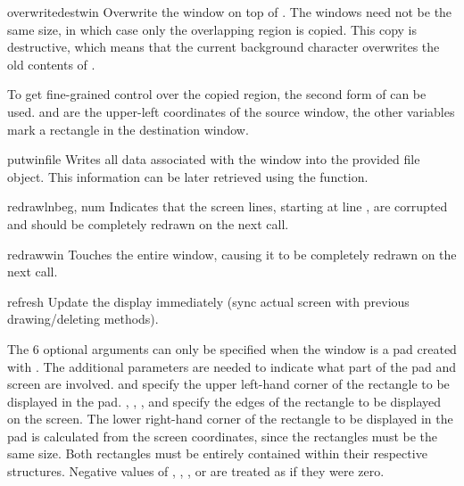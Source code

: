 \begin{methoddesc}[window]{overwrite}{destwin}
Overwrite the window on top of . The windows need not be
the same size, in which case only the overlapping region is
copied. This copy is destructive, which means that the current
background character overwrites the old contents of .

To get fine-grained control over the copied region, the second form
of  can be used.  and  are
the upper-left coordinates of the source window, the other variables
mark a rectangle in the destination window.
\end{methoddesc}

\begin{methoddesc}[window]{putwin}{file}
Writes all data associated with the window into the provided file
object.  This information can be later retrieved using the
 function.
\end{methoddesc}

\begin{methoddesc}[window]{redrawln}{beg, num}
Indicates that the  screen lines, starting at line ,
are corrupted and should be completely redrawn on the next
 call.
\end{methoddesc}

\begin{methoddesc}[window]{redrawwin}{}
Touches the entire window, causing it to be completely redrawn on the
next  call.
\end{methoddesc}

\begin{methoddesc}[window]{refresh}{}
Update the display immediately (sync actual screen with previous
drawing/deleting methods).

The 6 optional arguments can only be specified when the window is a
pad created with .  The additional parameters are
needed to indicate what part of the pad and screen are involved.
 and  specify the upper left-hand corner of the
rectangle to be displayed in the pad.  , ,
, and  specify the edges of the rectangle to
be displayed on the screen.  The lower right-hand corner of the
rectangle to be displayed in the pad is calculated from the screen
coordinates, since the rectangles must be the same size.  Both
rectangles must be entirely contained within their respective
structures.  Negative values of , ,
, or  are treated as if they were zero.
\end{methoddesc}

